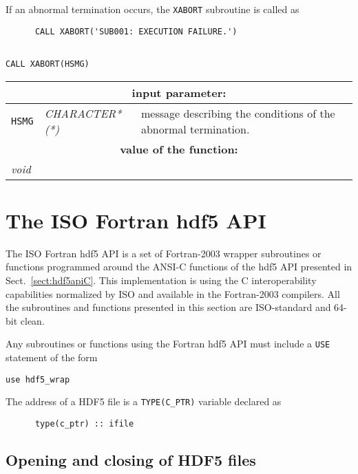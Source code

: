 \vskip 0.2cm

If an abnormal termination occurs, the {\tt XABORT} subroutine is called as
\begin{verbatim}
      CALL XABORT('SUB001: EXECUTION FAILURE.')
\end{verbatim}

\begin{verbatim}

CALL XABORT(HSMG)
\end{verbatim}

\noindent
\begin{tabular}{|p{1.5cm}|p{3cm}|p{10cm}|}
\hline
\multicolumn{3}{|c|}{\bf input parameter:} \\
\hline
{\tt HSMG} & {\it CHARACTER*(*)} & message describing the conditions of the abnormal termination. \\
\hline
\multicolumn{3}{|c|}{\bf value of the function:} \\
\hline
\multicolumn{2}{|l|}{\it void} &  \\
\hline
\end{tabular}

\clearpage

\section {The ISO Fortran {\sc hdf5} API}

The ISO Fortran {\sc hdf5} API is a set of Fortran-2003 wrapper subroutines or functions programmed around the ANSI-C functions of the {\sc hdf5} API presented in Sect.~\ref{sect:hdf5apiC}. This implementation is using
the C interoperability capabilities normalized by ISO and available in the Fortran-2003 compilers. All the subroutines and functions presented in this section are ISO-standard and 64-bit clean.

\vskip 0.08cm

Any subroutines or functions using the Fortran {\sc hdf5} API must include a {\tt USE} statement of the form
\begin{verbatim}
use hdf5_wrap
\end{verbatim}

The address of a HDF5 file is a {\tt TYPE(C\_PTR)} variable declared as
\begin{verbatim}
      type(c_ptr) :: ifile
\end{verbatim}

\vskip 0.8cm

\subsection{Opening and closing of HDF5 files}


